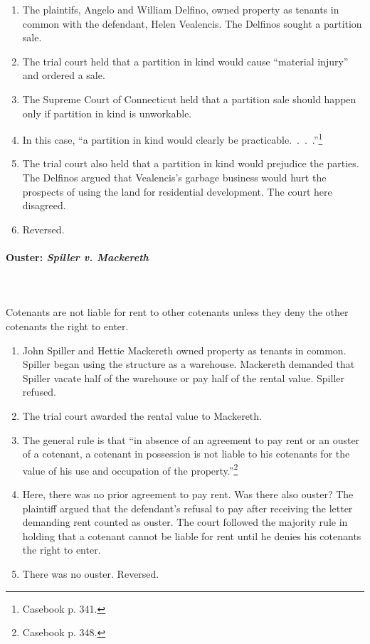 \begin{enumerate}
    \item The plaintifs, Angelo and William Delfino, owned property as tenants 
    in common with the defendant, Helen Vealencis. The Delfinos sought a 
    partition sale.
    \item The trial court held that a partition in kind would cause ``material 
    injury'' and ordered a sale.
    \item The Supreme Court of Connecticut held that a partition sale should 
    happen only if partition in kind is unworkable.
    \item In this case, ``a partition in kind would clearly be 
    practicable.~.~.~.''\footnote{Casebook p. 341.}
    \item The trial court also held that a partition in kind would prejudice 
    the parties. The Delfinos argued that Vealencis's garbage business would 
    hurt the prospects of using the land for residential development. The 
    court here disagreed.
    \item Reversed.
\end{enumerate}

\paragraph{Ouster: \emph{Spiller v. Mackereth}}
~\\\\Cotenants are not liable for rent to other cotenants unless they deny the 
other cotenants the right to enter.

\begin{enumerate}
    \item John Spiller and Hettie Mackereth owned property as tenants in 
    common. Spiller began using the structure as a warehouse. Mackereth 
    demanded that Spiller vacate half of the warehouse or pay half of the 
    rental value. Spiller refused.
    \item The trial court awarded the rental value to Mackereth.
    \item The general rule is that ``in absence of an agreement to pay rent or 
    an ouster of a cotenant, a cotenant in possession is not liable to his 
    cotenants for the value of his use and occupation of the 
    property.''\footnote{Casebook p. 348.}
    \item Here, there was no prior agreement to pay rent. Was there also 
    ouster? The plaintiff argued that the defendant's refusal to pay after 
    receiving the letter demanding rent counted as ouster. The court followed 
    the majority rule in holding that a cotenant cannot be liable for rent 
    until he denies his cotenants the right to enter.
    \item There was no ouster. Reversed.
\end{enumerate}

